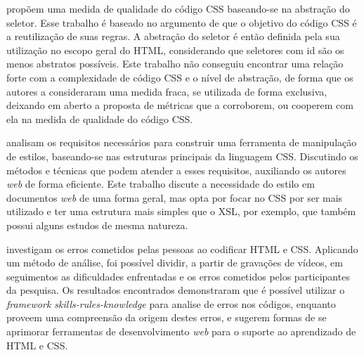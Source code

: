  propõem uma medida de qualidade do código CSS baseando-se na abstração do seletor. Esse trabalho é baseado no argumento de que o objetivo do código CSS é a reutilização de suas regras. A abstração do seletor é então definida pela sua utilização no escopo geral do HTML, considerando que seletores com id são os menos abstratos possíveis. Este trabalho não conseguiu encontrar uma relação forte com a complexidade de código CSS e o nível de abstração, de forma que os autores a consideraram uma medida fraca, se utilizada de forma exclusiva, deixando em aberto a proposta de métricas que a corroborem, ou cooperem com ela na medida de qualidade do código CSS.

 analisam os requisitos necessários para construir uma ferramenta de manipulação de estilos, baseando-se nas estruturas principais da linguagem CSS. Discutindo os métodos e técnicas que podem atender a esses requisitos, auxiliando os autores \textit{web} de forma eficiente. Este trabalho discute a necessidade do estilo em documentos \textit{web} de uma forma geral, mas opta por focar no CSS por ser mais utilizado e ter uma estrutura mais simples que o XSL, por exemplo, que também possui alguns estudos de mesma natureza.

 investigam os erros cometidos pelas pessoas ao codificar HTML e CSS. Aplicando um método de análise, foi possível dividir, a partir de gravações de vídeos, em seguimentos as dificuldades enfrentadas e os erros cometidos pelos participantes da pesquisa. Os resultados encontrados demonstraram que é possível utilizar o \textit{framework skills-rules-knowledge} para analise de erros nos códigos, enquanto proveem uma compreensão da origem destes erros, e sugerem formas de se aprimorar ferramentas de desenvolvimento \textit{web} para o suporte ao aprendizado de HTML e CSS.